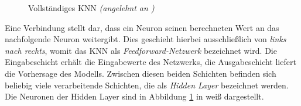 \begin{figure}[H]
   \centering
		\caption{Vollständiges \ac{KNN} \emph{(angelehnt an \cite{visualApproach})}}
      \label{fig:KNN}
\end{figure}

Eine Verbindung stellt dar, dass ein Neuron seinen berechneten Wert an das nachfolgende Neuron weitergibt. Dies geschieht hierbei ausschließlich von \emph{links nach rechts}, womit das \ac{KNN} als \emph{Feedforward-Netzwerk} bezeichnet wird. Die Eingabeschicht erhält die Eingabewerte des Netzwerks, die Ausgabeschicht liefert die Vorhersage des Modells. Zwischen diesen beiden Schichten befinden sich beliebig viele verarbeitende Schichten, die als \emph{Hidden Layer} bezeichnet werden. Die Neuronen der Hidden Layer sind in Abbildung \ref{fig:KNN} in weiß dargestellt. \cite{knnsKompakt}

